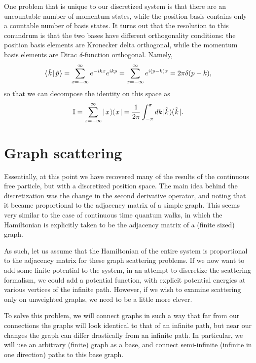 \documentclass[../thesis-main/thesis-main]{subfiles}
\begin{document}
One problem that is unique to our discretized system is that  there are an uncountable number of momentum states, while the position basis contains only a countable number of basis states.  It turns out that the resolution to this conundrum is that the two bases have different orthogonality conditions: the position basis elements are Kronecker delta orthogonal, while the momentum basis elements are Dirac $\delta$-function orthogonal.  Namely,
\begin{equation}
  \langle\mspace{2mu} \tilde{k} \mspace{2mu} | \mspace{2mu} \tilde{p}\mspace{2mu} \rangle = \sum_{x=-\infty}^\infty e^{- i k x} e^{i k p} = \sum_{x=-\infty}^\infty e^{i (p-k) x} = 2\pi \delta(p-k),
\end{equation}
so that we can decompose the identity on this space as 
\begin{equation}
\mathbb{I} = \sum_{x=-\infty}^\infty |\mspace{2mu} x \mspace{2mu} \rangle\mspace{-2mu}\langle\mspace{2mu} x \mspace{2mu} | = \frac{1}{2\pi} \int_{-\pi}^\pi dk |\mspace{2mu} \tilde{k} \mspace{2mu} \rangle\mspace{-2mu}\langle\mspace{2mu} \tilde{k} \mspace{2mu} |.
\end{equation}


\section{Graph scattering}

Essentially, at this point we have recovered many of the results of the continuous free particle, but with a discretized position space.  The main idea behind the discretization was the change in the second derivative operator, and noting that it became proportional to the adjacency matrix of a simple graph.  This seems very similar to the case of continuous time quantum walks, in which the Hamiltonian is explicitly taken to be the adjacency matrix of a (finite sized) graph. 

As such, let us assume that the Hamiltonian of the entire system is proportional to the adjacency matrix for these graph scattering problems.  If we now want to add some finite potential to the system, in an attempt to discretize the scattering formalism, we could add a potential function, with explicit potential energies at various vertices of the infinite path.  However, if we wish to examine scattering only on unweighted graphs, we need to be a little more clever.  

To solve this problem, we will connect graphs in such a way that far from our connections the graphs will look identical to that of an infinite path, but near our changes the graph can differ drastically from an infinite path.  In particular, we will use an arbitrary (finite) graph as a base, and connect semi-infinite (infinite in one direction) paths to this base graph.
\end{document}
